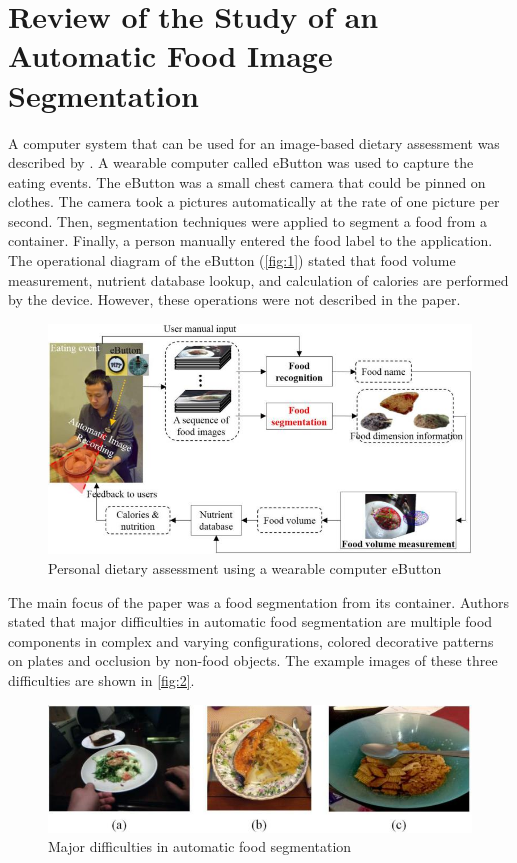 \section{ Review of the  Study of an Automatic Food Image Segmentation }
A computer system that can be used for an image-based dietary assessment was described by \cite{chen2015saliency}. A wearable computer called eButton was used to capture the eating events. The eButton was a small chest camera that could be pinned on clothes. The camera took a pictures automatically at the rate of one picture per second. Then, segmentation techniques were applied to segment a food from a container. Finally, a person manually entered the food label to the application. The operational diagram of the eButton (\autoref{fig:1}) stated that food volume measurement, nutrient database lookup, and calculation of calories are performed by the device. However, these operations were not described in the paper. 

\begin{figure}[ht]
\includegraphics{Figures/segm_01.jpg}
\caption{Personal dietary assessment using a wearable computer eButton \citep{chen2015saliency} }
\label{fig:1}
\end{figure}

The main focus of the paper was a food segmentation from its container. Authors stated that major difficulties in automatic food segmentation are multiple food components in complex and varying configurations, colored decorative patterns on plates and occlusion by non-food objects. The example images of these three difficulties are shown in \autoref{fig:2}.

\begin{figure}[ht]
\includegraphics{Figures/segm_02.jpg}
\caption{Major difficulties in automatic food segmentation \citep{chen2015saliency}}
\label{fig:2}
\end{figure}


